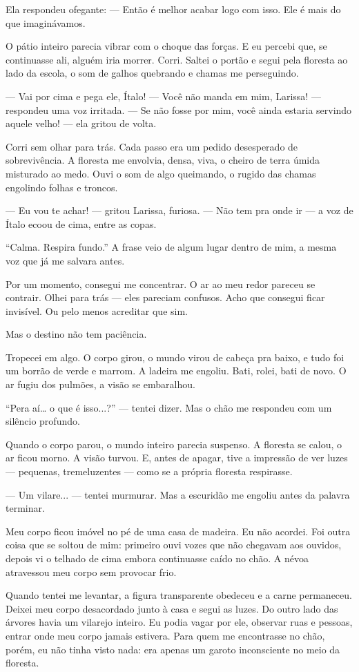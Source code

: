 Ela respondeu ofegante:  
— Então é melhor acabar logo com isso. Ele é mais do que imaginávamos.

O pátio inteiro parecia vibrar com o choque das forças.  
E eu percebi que, se continuasse ali, alguém iria morrer.  
Corri.  
Saltei o portão e segui pela floresta ao lado da escola, o som de galhos quebrando e chamas me perseguindo.

— Vai por cima e pega ele, Ítalo!  
— Você não manda em mim, Larissa! — respondeu uma voz irritada.  
— Se não fosse por mim, você ainda estaria servindo aquele velho! — ela gritou de volta.

Corri sem olhar para trás.  
Cada passo era um pedido desesperado de sobrevivência.  
A floresta me envolvia, densa, viva, o cheiro de terra úmida misturado ao medo.  
Ouvi o som de algo queimando, o rugido das chamas engolindo folhas e troncos.

— Eu vou te achar! — gritou Larissa, furiosa.  
— Não tem pra onde ir — a voz de Ítalo ecoou de cima, entre as copas.

“Calma. Respira fundo.”  
A frase veio de algum lugar dentro de mim, a mesma voz que já me salvara antes.

Por um momento, consegui me concentrar.  
O ar ao meu redor pareceu se contrair.  
Olhei para trás — eles pareciam confusos.  
Acho que consegui ficar invisível.  
Ou pelo menos acreditar que sim.

Mas o destino não tem paciência.

Tropecei em algo.  
O corpo girou, o mundo virou de cabeça pra baixo, e tudo foi um borrão de verde e marrom.  
A ladeira me engoliu.  
Bati, rolei, bati de novo.  
O ar fugiu dos pulmões, a visão se embaralhou.  

“Pera aí… o que é isso...?” — tentei dizer.  
Mas o chão me respondeu com um silêncio profundo.

Quando o corpo parou, o mundo inteiro parecia suspenso.  
A floresta se calou, o ar ficou morno.  
A visão turvou.  
E, antes de apagar, tive a impressão de ver luzes — pequenas, tremeluzentes — como se a própria floresta respirasse.

— Um vilare... — tentei murmurar.  
Mas a escuridão me engoliu antes da palavra terminar.

Meu corpo ficou imóvel no pé de uma casa de madeira. Eu não acordei. Foi outra coisa que se soltou de mim: primeiro ouvi vozes que não chegavam aos ouvidos, depois vi o telhado de cima embora continuasse caído no chão. A névoa atravessou meu corpo sem provocar frio.

Quando tentei me levantar, a figura transparente obedeceu e a carne permaneceu. Deixei meu corpo desacordado junto à casa e segui as luzes. Do outro lado das árvores havia um vilarejo inteiro. Eu podia vagar por ele, observar ruas e pessoas, entrar onde meu corpo jamais estivera. Para quem me encontrasse no chão, porém, eu não tinha visto nada: era apenas um garoto inconsciente no meio da floresta.
